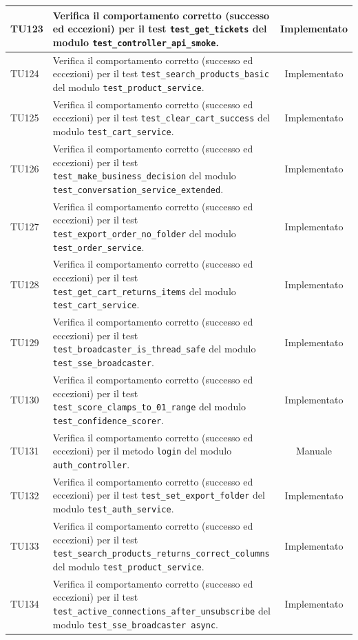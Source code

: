 \documentclass[a4paper,11pt,oneside]{scrartcl}
\begin{document}
\begin{longtable}{|p{1.9cm}|p{11.6cm}|c|}
    TU123 & Verifica il comportamento corretto (successo ed eccezioni) per il test \texttt{test\_get\_tickets} del modulo \texttt{test\_controller\_api\_smoke}. & Implementato \\ \hline
    TU124 & Verifica il comportamento corretto (successo ed eccezioni) per il test \texttt{test\_search\_products\_basic} del modulo \texttt{test\_product\_service}. & Implementato \\ \hline
    TU125 & Verifica il comportamento corretto (successo ed eccezioni) per il test \texttt{test\_clear\_cart\_success} del modulo \texttt{test\_cart\_service}. & Implementato \\ \hline
    TU126 & Verifica il comportamento corretto (successo ed eccezioni) per il test \texttt{test\_make\_business\_decision} del modulo \texttt{test\_conversation\_service\_extended}. & Implementato \\ \hline
    TU127 & Verifica il comportamento corretto (successo ed eccezioni) per il test \texttt{test\_export\_order\_no\_folder} del modulo \texttt{test\_order\_service}. & Implementato \\ \hline
    TU128 & Verifica il comportamento corretto (successo ed eccezioni) per il test \texttt{test\_get\_cart\_returns\_items} del modulo \texttt{test\_cart\_service}. & Implementato \\ \hline
    TU129 & Verifica il comportamento corretto (successo ed eccezioni) per il test \texttt{test\_broadcaster\_is\_thread\_safe} del modulo \texttt{test\_sse\_broadcaster}. & Implementato \\ \hline
    TU130 & Verifica il comportamento corretto (successo ed eccezioni) per il test \texttt{test\_score\_clamps\_to\_01\_range} del modulo \texttt{test\_confidence\_scorer}. & Implementato \\ \hline
    TU131 & Verifica il comportamento corretto (successo ed eccezioni) per il metodo \texttt{login} del modulo \texttt{auth\_controller}. & Manuale \\ \hline
    TU132 & Verifica il comportamento corretto (successo ed eccezioni) per il test \texttt{test\_set\_export\_folder} del modulo \texttt{test\_auth\_service}. & Implementato \\ \hline
    TU133 & Verifica il comportamento corretto (successo ed eccezioni) per il test \texttt{test\_search\_products\_returns\_correct\_columns} del modulo \texttt{test\_product\_service}. & Implementato \\ \hline
    TU134 & Verifica il comportamento corretto (successo ed eccezioni) per il test \texttt{test\_active\_connections\_after\_unsubscribe} del modulo \texttt{test\_sse\_broadcaster     async}. & Implementato \\ \hline

\end{longtable}
\end{document}
